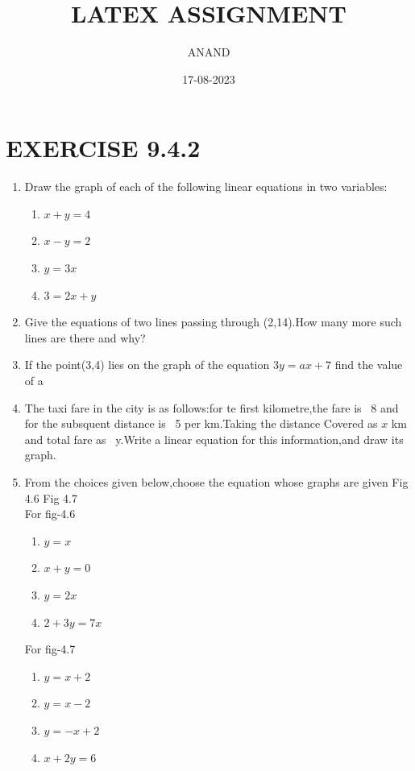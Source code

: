\documentclass[10pt]{article}
\begin{document}
\title{LATEX ASSIGNMENT}
\author{ANAND}
\date{17-08-2023}
\maketitle
\section*{EXERCISE 9.4.2}
\begin{enumerate}[label=\arabic*.,ref=\theenumi]
\item Draw the graph of each of the following linear equations in two variables:
\begin{enumerate}[label=(\roman*),ref=\theenumi]
\item $x+y=4$
\item $x-y=2$
\item $y=3x$
\item $3=2x+y$
\end{enumerate}
\item Give the equations of two lines passing through (2,14).How many more such lines are there and 
why?
\item If the point(3,4) lies on the graph of the equation $3y=ax+7$ find the value of a
\item The taxi fare in the city is as follows:for te first kilometre,the fare is \rupee~8 and for the 
subsquent distance is \rupee~5 per km.Taking the distance Covered as $x$ km and total fare as
\rupee~y.Write a linear equation for this information,and draw its graph.
\item From the choices given below,choose the equation whose graphs are given Fig 4.6 Fig 4.7
\\
For fig-4.6 
\begin{enumerate}[label=(\roman*)]
\item $y=x$
\item $x+y=0$
\item $y=2x$
\item $2+3y=7x$
\end{enumerate} 
For fig-4.7 
\begin{enumerate}[label=(\roman*)]
\item $y=x+2$
\item $y=x-2$
\item $y=-x+2$
\item $x+2y=6$
\end{enumerate}
\begin{figure}[ht]
\centering

\end{figure}
\end{enumerate}
\end{document}

